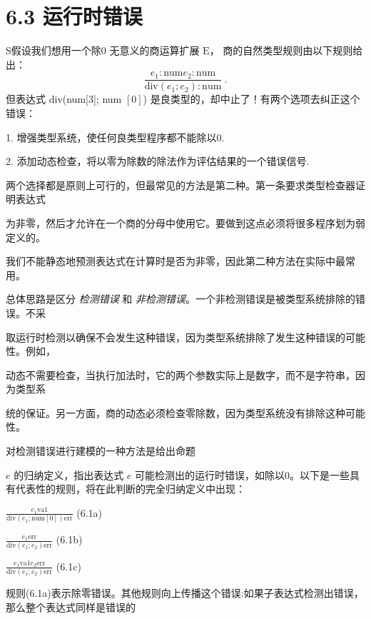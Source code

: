 \section{6.3 运行时错误}

S假设我们想用一个除0 无意义的商运算扩展 $\mathrm{E}$， 商的自然类型规则由以下规则给出：
$$
\frac{e_{1}:\mathrm{n}\mathrm{u}\mathrm{m}e_{2}:\mathrm{n}\mathrm{u}\mathrm{m}}{\mathrm{d}\mathrm{i}\mathrm{v}(e_{1};e_{2}):\mathrm{n}\mathrm{u}\mathrm{m}}\ .
$$
但表达式 $\mathrm{d}\mathrm{i}\mathrm{v}$(num[3]; num $[0]$) 是良类型的，却中止了！有两个选项去纠正这个错误：

1. 增强类型系统，使任何良类型程序都不能除以0.

2. 添加动态检查，将以零为除数的除法作为评估结果的一个错误信号.

两个选择都是原则上可行的，但最常见的方法是第二种。第一条要求类型检查器证明表达式

为非零，然后才允许在一个商的分母中使用它。要做到这点必须将很多程序划为弱定义的。

我们不能静态地预测表达式在计算时是否为非零，因此第二种方法在实际中最常用。

总体思路是区分 {\it 检测错误} 和 {\it 非检测错误}。一个非检测错误是被类型系统排除的错误。不采

取运行时检测以确保不会发生这种错误，因为类型系统排除了发生这种错误的可能性。例如，

动态不需要检查，当执行加法时，它的两个参数实际上是数字，而不是字符串，因为类型系

统的保证。另一方面，商的动态必须检查零除数，因为类型系统没有排除这种可能性。

对检测错误进行建模的一种方法是给出命题%

$e$ 的归纳定义，指出表达式 $e$ 可能检测出的运行时错误，如除以0。以下是一些具有代表性的规则，将在此判断的完全归纳定义中出现：
\begin{center}%
$\displaystyle \frac{e_{1}\mathrm{v}\mathrm{a}1}{\mathrm{d}\mathrm{i}\mathrm{v}(e_{1};\mathrm{n}\mathrm{u}\mathrm{m}[0])\mathrm{e}\mathrm{r}\mathrm{r}}$   (6.1a)

$\displaystyle \frac{e_{1}\mathrm{e}\mathrm{r}\mathrm{r}}{\mathrm{d}\mathrm{i}\mathrm{v}(e_{1};e_{2})\mathrm{e}\mathrm{r}\mathrm{r}}$   (6.1b)

$\displaystyle \frac{e_{1}\mathrm{v}\mathrm{a}1e_{2}\mathrm{e}\mathrm{r}\mathrm{r}}{\mathrm{d}\mathrm{i}\mathrm{v}(e_{1};e_{2})\mathrm{e}\mathrm{r}\mathrm{r}}$   (6.1c)
\end{center}
规则(6.1a)表示除零错误。其他规则向上传播这个错误:如果子表达式检测出错误，那么整个表达式同样是错误的%

